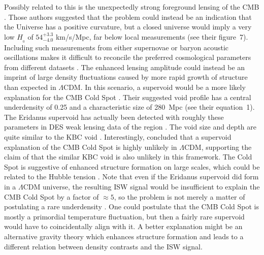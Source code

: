 \documentclass[fleqn,usenatbib,useAMS]{mnras} %
\begin{document}
Possibly related to this is the unexpectedly strong foreground lensing of the CMB \citep*{Valentino_2020_flat}. Those authors suggested that the problem could instead be an indication that the Universe has a positive curvature, but a closed universe would imply a very low $H_{_0}$ of $54^{+3.3}_{-4.0}$ km/s/Mpc, far below local measurements (see their figure~7). Including such measurements from either supernovae or baryon acoustic oscillations makes it difficult to reconcile the preferred cosmological parameters from different datasets \citep{Handley_2021}. The enhanced lensing amplitude could instead be an imprint of large density fluctuations caused by more rapid growth of structure than expected in $\Lambda$CDM. In this scenario, a supervoid would be a more likely explanation for the CMB Cold Spot \citep{Nadathur_2014}. Their suggested void profile has a central underdensity of 0.25 and a characteristic size of 280~Mpc (see their equation~1). The Eridanus supervoid has actually been detected with roughly these parameters in DES weak lensing data of the region \citep{Kovacs_2022_Cold_Spot}. The void size and depth are quite similar to the KBC void \citep{Haslbauer_2020}. Interestingly, \citet{Nadathur_2014} concluded that a supervoid explanation of the CMB Cold Spot is highly unlikely in $\Lambda$CDM, supporting the claim of \citet{Haslbauer_2020} that the similar KBC void is also unlikely in this framework. The Cold Spot is suggestive of enhanced structure formation on large scales, which could be related to the Hubble tension \citep{Kovacs_2020}. Note that even if the Eridanus supervoid did form in a $\Lambda$CDM universe, the resulting ISW signal would be insufficient to explain the CMB Cold Spot by a factor of $\approx 5$, so the problem is not merely a matter of postulating a rare underdensity \citep{Kovacs_2022_Cold_Spot}. One could postulate that the CMB Cold Spot is mostly a primordial temperature fluctuation, but then a fairly rare supervoid would have to coincidentally align with it. A better explanation might be an alternative gravity theory which enhances structure formation and leads to a different relation between density contrasts and the ISW signal.
\end{document}
